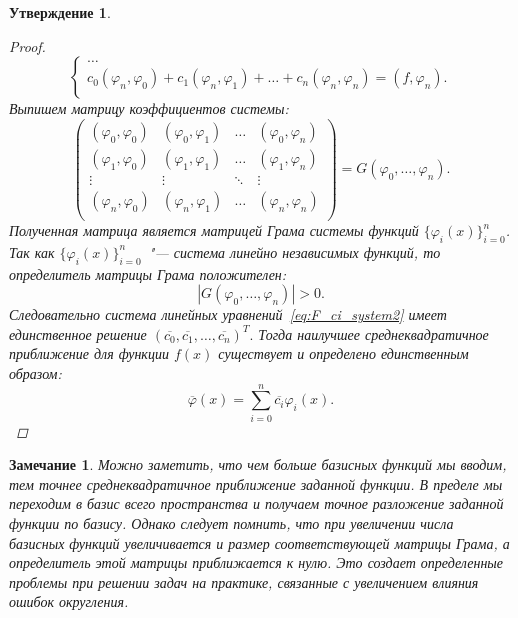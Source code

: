 \documentclass[11pt,a4paper,twoside,listtotoc,bibtotoc]{report}
\numberwithin{equation}{section}
\newtheorem*{statement}{Утверждение}
\theoremstyle{definition}
\theoremstyle{plain}
\newtheorem{note}{Замечание}[section]
\begin{document}
\begin{statement}
\begin{proof}
\begin{equation}
\begin{cases}
                \dots \\
                c_0(\varphi_n, \varphi_0) + c_1 (\varphi_n, \varphi_1) +
                \ldots + c_n (\varphi_n, \varphi_n) = (f, \varphi_n). \\
            \end{cases}
        \end{equation}
        Выпишем матрицу коэффициентов системы:
        $$
        \begin{pmatrix}
            (\varphi_0, \varphi_0) & (\varphi_0, \varphi_1) & \dots &
            (\varphi_0, \varphi_n) \\
            (\varphi_1, \varphi_0) & (\varphi_1, \varphi_1) & \dots &
            (\varphi_1, \varphi_n) \\
            \vdots & \vdots & \ddots & \vdots \\
            (\varphi_n, \varphi_0) & (\varphi_n, \varphi_1) & \dots &
            (\varphi_n, \varphi_n) \\
        \end{pmatrix}
        = G(\varphi_0, \ldots, \varphi_n).
        $$
        Полученная матрица является матрицей Грама системы функций
        $\{\varphi_i(x)\}_{i=0}^n$. Так как $\{\varphi_i(x)\}_{i=0}^n$~"--- система линейно независимых
        функций, то определитель матрицы Грама положителен:
        $$
            |G(\varphi_0, \ldots, \varphi_n)| > 0.
        $$
        Следовательно система линейных уравнений~\eqref{eq:F_ci_system2} имеет
        единственное решение $(\overline{c_0}, \overline{c_1}, \dots, \overline{c_n})^T.$
        Тогда наилучшее среднеквадратичное приближение для функции $f(x)$ существует
        и определено единственным образом:
        $$
            \overline{\varphi}(x) = \sum_{i=0}^n \overline{c_i} \varphi_i(x).
        $$
    \end{proof}
%
\end{statement}
%
%
\begin{note}
%
Можно заметить, что чем больше базисных функций мы вводим, тем
точнее среднеквадратичное приближение заданной функции. В пределе
мы переходим в базис всего пространства и получаем точное разложение заданной
функции по базису. Однако следует помнить, что при увеличении числа
базисных функций увеличивается и размер соответствующей матрицы Грама, а
определитель этой матрицы приближается к нулю. Это создает определенные
проблемы при решении задач на практике, связанные с увеличением
влияния ошибок округления.
%
\end{note}
\end{document}

